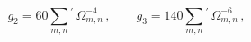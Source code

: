 \begin{equation}
g_2 = 60 \sum_{m,n}{}^{\prime}\, \Omega_{m,n}^{-4}\,, \qquad
g_3 = 140 \sum_{m,n}{}^{\prime}\, \Omega_{m,n}^{-6}\,,
\end{equation}

